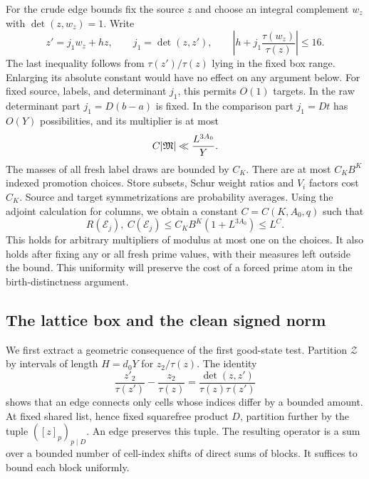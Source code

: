 For the crude edge bounds fix the source $z$ and choose an integral
complement $w_z$ with $\det(z,w_z)=1$. Write
\begin{equation}\label{mem:neighbor}
 z'=j_1w_z+h z,\qquad j_1=\det(z,z'),\qquad
 \left|h+j_1\frac{\tau(w_z)}{\tau(z)}\right|\le16.
\end{equation}
The last inequality follows from $\tau(z')/\tau(z)$ lying in the
fixed box range. Enlarging its absolute constant would have no effect
on any argument below. For fixed source, labels, and determinant
$j_1$, this permits $O(1)$ targets. In the raw determinant part
$j_1=D(b-a)$ is fixed. In the comparison part $j_1=Dt$ has $O(Y)$
possibilities, and its multiplier is at most
\begin{equation}\label{mem:major-absolute}
 C\lvert\mathfrak M\rvert\ll \frac{L^{3A_0}}{Y}.
\end{equation}
The masses of all fresh label draws are bounded by $C_K$.
There are at most $C_KB^K$ indexed promotion choices. Store subsets,
Schur weight ratios and $V_i$ factors cost $C_K$. Source and target
symmetrizations are probability averages. Using the adjoint
calculation for columns, we obtain a constant $C=C(K,A_0,q)$ such that
\begin{equation}\label{mem:edge-crude}
 R(\mathcal E_j),\ C(\mathcal E_j)
       \le C_K B^K(1+L^{3A_0})\le L^C.
\end{equation}
This holds for arbitrary multipliers of modulus at most one on the
choices. It also holds after fixing any or all fresh prime values,
with their measures left outside the bound. This uniformity will
preserve the cost of a forced prime atom in the birth-distinctness
argument.

\subsection{The lattice box and the clean signed norm}

We first extract a geometric consequence of the first good-state
test. Partition $\mathcal Z$ by intervals of length $H=d_0Y$ for
$z_2/\tau(z)$. The identity
\[
 \frac{z'_2}{\tau(z')}-\frac{z_2}{\tau(z)}
      =\frac{\det(z,z')}{\tau(z)\tau(z')}
\]
shows that an edge connects only cells whose indices differ by a
bounded amount. At fixed shared list, hence fixed squarefree product
$D$, partition further by the tuple $([z]_p)_{p\mid D}$. An edge
preserves this tuple. The resulting operator is a sum over a bounded
number of cell-index shifts of direct sums of blocks. It suffices to
bound each block uniformly.

